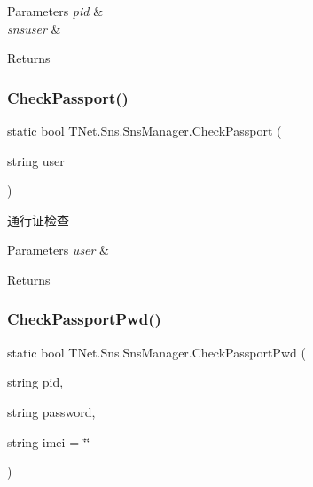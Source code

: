 \begin{DoxyParams}{Parameters}
{\em pid} & \\
\hline
{\em snsuser} & \\
\hline
\end{DoxyParams}
\begin{DoxyReturn}{Returns}

\end{DoxyReturn}
\mbox{\label{class_t_net_1_1_sns_1_1_sns_manager_a4ae5a1995dd3ee5dfc9048b32d655571}} 
\subsubsection{\texorpdfstring{Check\+Passport()}{CheckPassport()}}
{\footnotesize\ttfamily static bool T\+Net.\+Sns.\+Sns\+Manager.\+Check\+Passport (\begin{DoxyParamCaption}\item[{string}]{user }\end{DoxyParamCaption})\hspace{0.3cm}{\ttfamily [static]}}



通行证检查 


\begin{DoxyParams}{Parameters}
{\em user} & \\
\hline
\end{DoxyParams}
\begin{DoxyReturn}{Returns}

\end{DoxyReturn}
\mbox{\label{class_t_net_1_1_sns_1_1_sns_manager_a6352e554313329f388273f85d4aaf37f}} 
\subsubsection{\texorpdfstring{Check\+Passport\+Pwd()}{CheckPassportPwd()}}
{\footnotesize\ttfamily static bool T\+Net.\+Sns.\+Sns\+Manager.\+Check\+Passport\+Pwd (\begin{DoxyParamCaption}\item[{string}]{pid,  }\item[{string}]{password,  }\item[{string}]{imei = {\ttfamily \char`\"{}\char`\"{}} }\end{DoxyParamCaption})\hspace{0.3cm}{\ttfamily [static]}}



